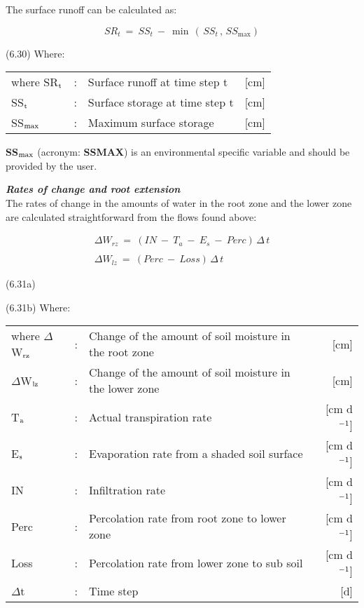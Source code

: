 The surface runoff can be calculated as:

\begin{equation}
SR _{t} ~=~ SS _{t} ~-~ \min \, (\, SS _{t} \, ,\, SS _{\max } )
\end{equation}

 
\strut\hfill (6.30)
Where:\\
\begin{tabularx}{\textwidth}{llXr}



where SR$_{{\rm t}}$ &:& Surface runoff at time step t  & [cm]\\
SS$_{{\rm t}}$ &:& Surface storage at time step t  & [cm]\\
SS$_{{\rm max}}$ &:& Maximum surface storage  & [cm]
\end{tabularx}

 
{\bf SS$_{{\rm max}}$} (acronym: {\bf SSMAX}) is an environmental specific variable and should be provided
by the user.



{\bf {\it Rates of change and root extension\/}}\\
The rates of change in the amounts of water in the root zone and the lower zone are
calculated straightforward from the flows found above:

\begin{eqnarray*}
\Delta W _{rz} ~=~ (IN ~-~ T _{a} ~-~ E _{s} ~-~ Perc)\,\Delta \, t  \nonumber  \\
~ \nonumber  \\
\Delta W _{lz} ~=~ (Perc ~-~ Loss)\,\Delta \, t
\end{eqnarray*}

 
\strut\hfill (6.31a)

\strut\hfill (6.31b)
Where:\\
\begin{tabularx}{\textwidth}{llXr}



where $\Delta$W$_{{\rm rz}}$ &:& Change of the amount of soil moisture in the root zone  & [cm]\\
$\Delta$W$_{{\rm lz}}$ &:& Change of the amount of soil moisture in the lower zone  & [cm]\\
T$_{{\rm a}}$ &:& Actual transpiration rate   & [cm d$^{{\rm -1}}$]\\
E$_{{\rm s}}$ &:& Evaporation rate from a shaded soil surface  & [cm d$^{{\rm -1}}$]\\
IN &:& Infiltration rate  & [cm d$^{{\rm -1}}$]\\
Perc &:& Percolation rate from root zone to lower zone  & [cm d$^{{\rm -1}}$]\\
Loss &:& Percolation rate from lower zone to sub soil  & [cm d$^{{\rm -1}}$]\\
$\Delta$t &:& Time step  & [d]
\end{tabularx}



